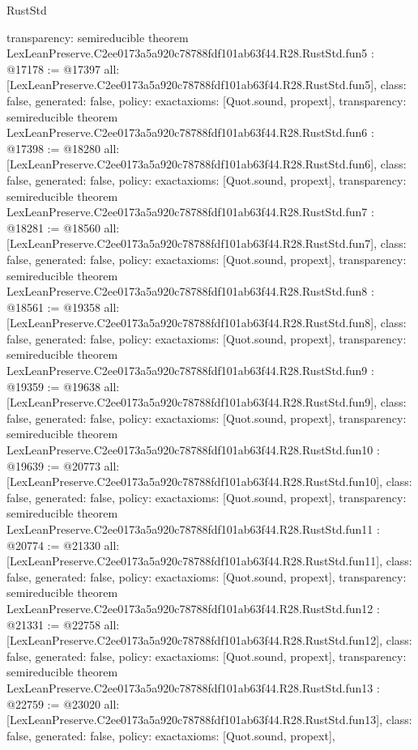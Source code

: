 \begin{lexlean}{RustStd}
\begin{coremodule}
{  transparency: semireducible
}
theorem LexLeanPreserve.C2ee0173a5a920c78788fdf101ab63f44.R28.RustStd.fun5 : @17178 := @17397 {
  all: [LexLeanPreserve.C2ee0173a5a920c78788fdf101ab63f44.R28.RustStd.fun5],
  class: false,
  generated: false,
  policy: exact{axioms: [Quot.sound, propext]},
  transparency: semireducible
}
theorem LexLeanPreserve.C2ee0173a5a920c78788fdf101ab63f44.R28.RustStd.fun6 : @17398 := @18280 {
  all: [LexLeanPreserve.C2ee0173a5a920c78788fdf101ab63f44.R28.RustStd.fun6],
  class: false,
  generated: false,
  policy: exact{axioms: [Quot.sound, propext]},
  transparency: semireducible
}
theorem LexLeanPreserve.C2ee0173a5a920c78788fdf101ab63f44.R28.RustStd.fun7 : @18281 := @18560 {
  all: [LexLeanPreserve.C2ee0173a5a920c78788fdf101ab63f44.R28.RustStd.fun7],
  class: false,
  generated: false,
  policy: exact{axioms: [Quot.sound, propext]},
  transparency: semireducible
}
theorem LexLeanPreserve.C2ee0173a5a920c78788fdf101ab63f44.R28.RustStd.fun8 : @18561 := @19358 {
  all: [LexLeanPreserve.C2ee0173a5a920c78788fdf101ab63f44.R28.RustStd.fun8],
  class: false,
  generated: false,
  policy: exact{axioms: [Quot.sound, propext]},
  transparency: semireducible
}
theorem LexLeanPreserve.C2ee0173a5a920c78788fdf101ab63f44.R28.RustStd.fun9 : @19359 := @19638 {
  all: [LexLeanPreserve.C2ee0173a5a920c78788fdf101ab63f44.R28.RustStd.fun9],
  class: false,
  generated: false,
  policy: exact{axioms: [Quot.sound, propext]},
  transparency: semireducible
}
theorem LexLeanPreserve.C2ee0173a5a920c78788fdf101ab63f44.R28.RustStd.fun10 : @19639 := @20773 {
  all: [LexLeanPreserve.C2ee0173a5a920c78788fdf101ab63f44.R28.RustStd.fun10],
  class: false,
  generated: false,
  policy: exact{axioms: [Quot.sound, propext]},
  transparency: semireducible
}
theorem LexLeanPreserve.C2ee0173a5a920c78788fdf101ab63f44.R28.RustStd.fun11 : @20774 := @21330 {
  all: [LexLeanPreserve.C2ee0173a5a920c78788fdf101ab63f44.R28.RustStd.fun11],
  class: false,
  generated: false,
  policy: exact{axioms: [Quot.sound, propext]},
  transparency: semireducible
}
theorem LexLeanPreserve.C2ee0173a5a920c78788fdf101ab63f44.R28.RustStd.fun12 : @21331 := @22758 {
  all: [LexLeanPreserve.C2ee0173a5a920c78788fdf101ab63f44.R28.RustStd.fun12],
  class: false,
  generated: false,
  policy: exact{axioms: [Quot.sound, propext]},
  transparency: semireducible
}
theorem LexLeanPreserve.C2ee0173a5a920c78788fdf101ab63f44.R28.RustStd.fun13 : @22759 := @23020 {
  all: [LexLeanPreserve.C2ee0173a5a920c78788fdf101ab63f44.R28.RustStd.fun13],
  class: false,
  generated: false,
  policy: exact{axioms: [Quot.sound, propext]},
}
\end{coremodule}
\end{lexlean}
